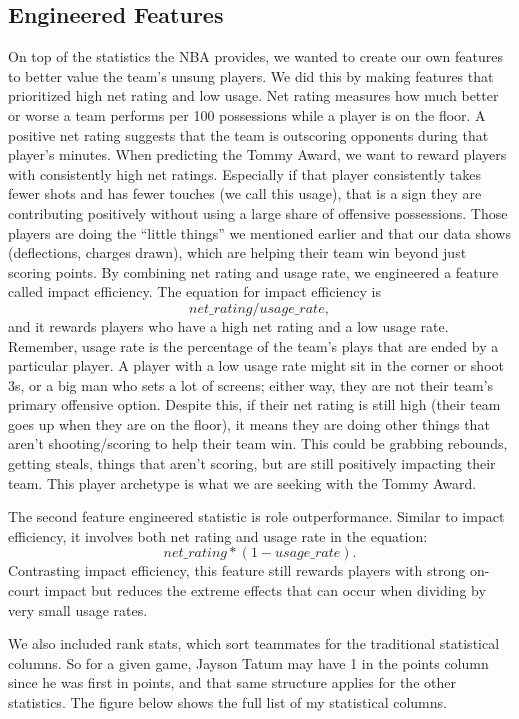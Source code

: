 \documentclass[11pt]{article}
\begin{document}
\subsection{Engineered Features}
On top of the statistics the NBA provides, we wanted to create our own features to better value the team's unsung players. We did this by making features that prioritized high net rating and low usage. Net rating measures how much better or worse a team performs per 100 possessions while a player is on the floor. A positive net rating suggests that the team is outscoring opponents during that player's minutes. When predicting the Tommy Award, we want to reward players with consistently high net ratings. Especially if that player consistently takes fewer shots and has fewer touches (we call this usage), that is a sign they are contributing positively without using a large share of offensive possessions. Those players are doing the ``little things'' we mentioned earlier and that our data shows (deflections, charges drawn), which are helping their team win beyond just scoring points. By combining net rating and usage rate, we engineered a feature called impact efficiency. The equation for impact efficiency is
\[
  net\_rating / usage\_rate,
\]
and it rewards players who have a high net rating and a low usage rate. Remember, usage rate is the percentage of the team's plays that are ended by a particular player. A player with a low usage rate might sit in the corner or shoot 3s, or a big man who sets a lot of screens; either way, they are not their team's primary offensive option. Despite this, if their net rating is still high (their team goes up when they are on the floor), it means they are doing other things that aren't shooting/scoring to help their team win. This could be grabbing rebounds, getting steals, things that aren't scoring, but are still positively impacting their team. This player archetype is what we are seeking with the Tommy Award.

The second feature engineered statistic is role outperformance. Similar to impact efficiency, it involves both net rating and usage rate in the equation:
\[
  net\_rating * (1 - usage\_rate).
\]
Contrasting impact efficiency, this feature still rewards players with strong on-court impact but reduces the extreme effects that can occur when dividing by very small usage rates.

We also included rank stats, which sort teammates for the traditional statistical columns. So for a given game, Jayson Tatum may have 1 in the points column since he was first in points, and that same structure applies for the other statistics. The figure below shows the full list of my statistical columns.
\end{document}
